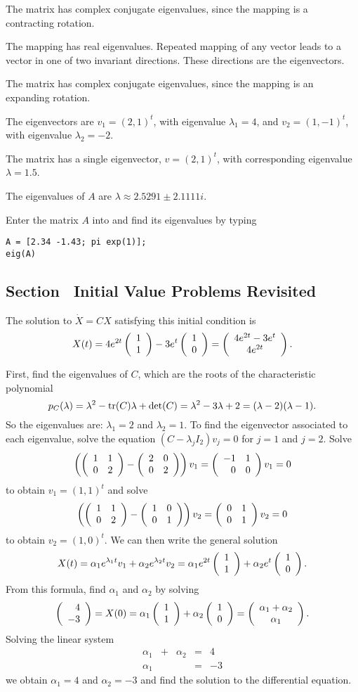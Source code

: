 \documentclass{ximera}
\begin{document}
 The matrix has complex conjugate eigenvalues, since the
mapping is a contracting rotation.

 The mapping has real eigenvalues.  Repeated mapping of any
vector leads to a vector in one of two invariant directions.  These
directions are the eigenvectors.

 The matrix has complex conjugate eigenvalues, since the
mapping is an expanding rotation.

 The eigenvectors are $v_1 = (2,1)^t$, with eigenvalue
$\lambda_1 = 4$, and $v_2 = (1,-1)^t$, with eigenvalue $\lambda_2 = -2$.

 The matrix has a single eigenvector, $v = (2,1)^t$, with
corresponding eigenvalue $\lambda = 1.5$.

 \ans The eigenvalues of $A$ are $\lambda \approx 2.5291 \pm
2.1111i$.

\soln Enter the matrix $A$ into \Matlab and find its eigenvalues by typing
\begin{verbatim}
A = [2.34 -1.43; pi exp(1)];
eig(A)
\end{verbatim}









\subsection*{Section~\protect{\ref{S:IVPR}} Initial Value Problems Revisited}


 \ans The solution to $\dot{X} = CX$ satisfying this
initial condition is
\[
X(t) = 4e^{2t}\left(\begin{array}{r} 1 \\ 1\end{array}\right) - 3e^t\left(\begin{array}{r} 1 \\ 0\end{array}\right)
= \left(\begin{array}{c} 4e^{2t} - 3e^t \\ 4e^{2t}\end{array}\right).
\]

\soln First, find the eigenvalues of $C$, which are the roots of the
characteristic polynomial
\[
p_C(\lambda) = \lambda^2 - {\rm tr}(C)\lambda + \det(C) =
\lambda^2 - 3\lambda + 2 = (\lambda - 2)(\lambda - 1).
\]
So the eigenvalues are: $\lambda_1 = 2$ and $\lambda_2 = 1$.
To find the eigenvector associated to each eigenvalue, solve
the equation $(C - \lambda_jI_2)v_j = 0$ for $j = 1$ and $j = 2$.  Solve
\[
\left(\left(\begin{array}{rr} 1 & 1\\ 0 &2\end{array}\right) - \left(\begin{array}{rr} 2 & 0\\ 0 &2\end{array}\right)\right)v_1 =
\left(\begin{array}{rr} -1 & 1\\ 0 &0\end{array}\right)v_1 = 0
\]
to obtain $v_1 = (1,1)^t$ and solve
\[
\left(\left(\begin{array}{rr} 1 & 1\\ 0 &2\end{array}\right) - \left(\begin{array}{rr} 1 & 0\\ 0 &1\end{array}\right)\right)v_2 =
\left(\begin{array}{rr} 0 & 1\\ 0 &1\end{array}\right)v_2 = 0
\]
to obtain $v_2 = (1,0)^t$.  We can then write the general solution
\[
X(t) = \alpha_1e^{\lambda_1 t}v_1 + \alpha_2e^{\lambda_2 t}v_2
= \alpha_1e^{2t}\left(\begin{array}{r} 1 \\ 1\end{array}\right) + \alpha_2e^t\left(\begin{array}{r} 1 \\ 0\end{array}\right).
\]
From this formula, find $\alpha_1$ and $\alpha_2$ by solving
\[
\left(\begin{array}{r} 4 \\ -3\end{array}\right) = X(0) = \alpha_1\left(\begin{array}{r} 1 \\ 1\end{array}\right) + \alpha_2\left(\begin{array}{r} 1 \\ 0\end{array}\right) =
\left(\begin{array}{c} \alpha_1 + \alpha_2 \\ \alpha_1\end{array}\right).
\]
Solving the linear system
\[
\begin{array}{rrrrr}
\alpha_1 & + & \alpha_2 & = & 4 \\
\alpha_1 & & & = & -3
\end{array}
\]
we obtain $\alpha_1 = 4$ and $\alpha_2 = -3$ and find the
solution to the differential equation.
\end{document}
